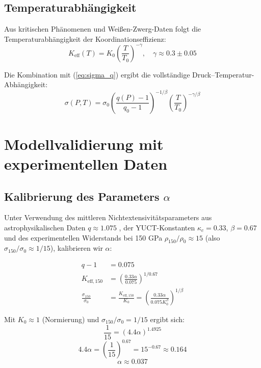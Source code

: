 \documentclass[12pt,a4paper]{article}
\theoremstyle{remark}
\newcommand{\Ke}{K_{\mathrm{eff}}}
\newcommand{\kappac}{\kappa_c}
\newcommand{\alp}{\alpha}
\begin{document}
	\subsection{Temperaturabhängigkeit}
	
	Aus kritischen Phänomenen und Weißen-Zwerg-Daten \cite{appendixP} folgt die Temperaturabhängigkeit der Koordinationseffizienz:
	\begin{equation}
		\Ke(T) = K_0 \left( \frac{T}{T_0} \right)^{-\gamma}, \quad \gamma \approx 0.3 \pm 0.05
		\label{eq:keff_temp}
	\end{equation}
	
	Die Kombination mit (\ref{eq:sigma_q}) ergibt die vollständige Druck–Temperatur-Abhängigkeit:
	\begin{equation}
		\sigma(P,T) = \sigma_0 \left( \frac{q(P)-1}{q_0-1} \right)^{-1/\beta} \left( \frac{T}{T_0} \right)^{-\gamma/\beta}
		\label{eq:sigma_PT}
	\end{equation}
	
	\section{Modellvalidierung mit experimentellen Daten}
	
	\subsection{Kalibrierung des Parameters \(\alp\)}
	
	Unter Verwendung des mittleren Nichtextensivitätsparameters aus astrophysikalischen Daten \(q \approx 1.075\) \cite{bertulani2015}, der YUCT-Konstanten \(\kappac = 0.33\), \(\beta = 0.67\) und des experimentellen Widerstands bei 150 GPa \(\rho_{150}/\rho_0 \approx 15\) (also \(\sigma_{150}/\sigma_0 \approx 1/15\)), kalibrieren wir \(\alp\):
	
	\begin{align}
		q - 1 &= 0.075 \nonumber \\
		K_{\mathrm{eff},150} &= \left( \frac{0.33 \alp}{0.075} \right)^{1/0.67} \nonumber \\
		\frac{\sigma_{150}}{\sigma_0} &= \frac{K_{\mathrm{eff},150}}{K_0} = \left( \frac{0.33 \alp}{0.075 K_0^{\beta}} \right)^{1/\beta} \label{eq:calibration}
	\end{align}
	
	Mit \(K_0 \approx 1\) (Normierung) und \(\sigma_{150}/\sigma_0 = 1/15\) ergibt sich:
	\[
	\frac{1}{15} = \left( 4.4 \alp \right)^{1.4925}
	\]
	\[
	4.4 \alp = \left( \frac{1}{15} \right)^{0.67} = 15^{-0.67} \approx 0.164
	\]
	\[
	\alp \approx 0.037
	\]
	
\end{document}

